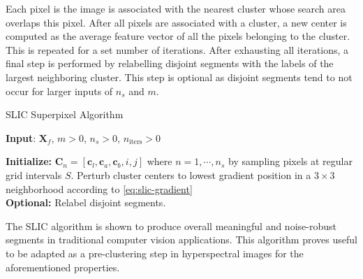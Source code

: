Each pixel is the image is associated with the nearest cluster whose search area overlaps this pixel. After all pixels are associated with a cluster, a new center is computed as the average feature vector of all the pixels belonging to the cluster. This is repeated for a set number of iterations. After exhausting all iterations, a final step is performed by relabelling disjoint segments with the labels of the largest neighboring cluster. This step is optional as disjoint segments tend to not occur for larger inputs of $n_s$ and $m$.

\begin{algorithm}
    \caption{SLIC Superpixel Algorithm}
    
    \textbf{Input}: $\mathbf{X}_f$, $m > 0$, $n_s > 0$, $n_{\text{iters}} > 0$

    \textbf{Initialize:} $\mathbf{C}_n = [\mathbf{c}_{l}, \mathbf{c}_{a}, \mathbf{c}_{b}, i, j]$ where $n = 1, \cdots, n_s$ by sampling pixels at regular grid intervals $S$. Perturb cluster centers to lowest gradient position in a $3 \times 3$ neighborhood according to \eqref{eq:slic-gradient} \\
    
    \textbf{Optional:} Relabel disjoint segments.
\end{algorithm}

The SLIC algorithm is shown to produce overall meaningful and noise-robust segments in traditional computer vision applications. This algorithm proves useful to be adapted as a pre-clustering step in hyperspectral images for the aforementioned properties.
